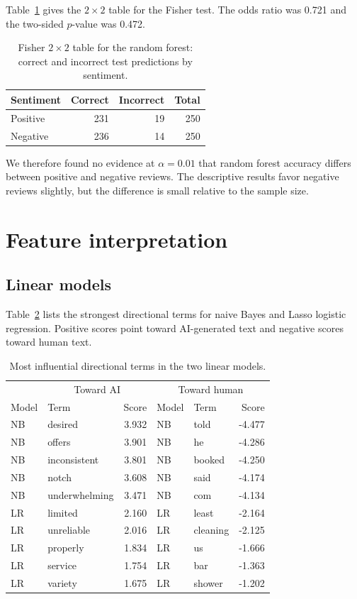 \documentclass[onecolumn]{jmlr}
\begin{document}
Table~\ref{tab:fisher} gives the $2\times2$ table for the Fisher test. The odds ratio was 0.721 and the two-sided $p$-value was 0.472.

\begin{table}[ht]
\centering
\caption{Fisher $2\times2$ table for the random forest: correct and incorrect test predictions by sentiment.}
\label{tab:fisher}
\begin{tabular}{lrrr}
\toprule
Sentiment & Correct & Incorrect & Total \\
\midrule
Positive & 231 & 19 & 250 \\
Negative & 236 & 14 & 250 \\
\bottomrule
\end{tabular}
\end{table}
 We therefore found no evidence at $\alpha=0.01$ that random forest accuracy differs between positive and negative reviews. The descriptive results favor negative reviews slightly, but the difference is small relative to the sample size.

\section{Feature interpretation}

\subsection{Linear models}

Table~\ref{tab:linear-features} lists the strongest directional terms for naive Bayes and Lasso logistic regression. Positive scores point toward AI-generated text and negative scores toward human text.

\begin{table}[ht]
\centering
\caption{Most influential directional terms in the two linear models.}
\label{tab:linear-features}
\small
\begin{tabular}{llrllr}
\toprule
& \multicolumn{2}{c}{Toward AI} & \multicolumn{3}{c}{Toward human} \\
Model & Term & Score & Model & Term & Score \\
\midrule
NB & desired & 3.932 & NB & told & -4.477 \\
NB & offers & 3.901 & NB & he & -4.286 \\
NB & inconsistent & 3.801 & NB & booked & -4.250 \\
NB & notch & 3.608 & NB & said & -4.174 \\
NB & underwhelming & 3.471 & NB & com & -4.134 \\
\midrule
LR & limited & 2.160 & LR & least & -2.164 \\
LR & unreliable & 2.016 & LR & cleaning & -2.125 \\
LR & properly & 1.834 & LR & us & -1.666 \\
LR & service & 1.754 & LR & bar & -1.363 \\
LR & variety & 1.675 & LR & shower & -1.202 \\
\bottomrule
\end{tabular}
\end{table}
\end{document}
